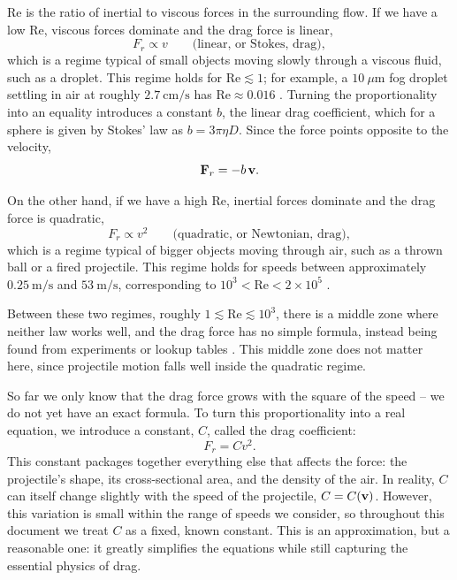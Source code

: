 \documentclass[11pt]{article}
\begin{document}
$\mathrm{Re}$ is the ratio of inertial to viscous forces in the
surrounding flow. If we have a low $\mathrm{Re}$, viscous forces
dominate and the drag force is linear,
\begin{equation}
    F_r \propto v \qquad \text{(linear, or Stokes, drag)},
\end{equation}
which is a regime typical of small objects moving slowly 
through a viscous fluid, such as a droplet. This regime holds for
$\mathrm{Re} \lesssim 1$; for example, a $10\ \mu\mathrm{m}$ fog
droplet settling in air at roughly $2.7\ \mathrm{cm/s}$ has
$\mathrm{Re} \approx 0.016$ \cite{lubarda2022}. Turning the
proportionality into an equality introduces a constant $b$, the linear
drag coefficient, which for a sphere is given by Stokes' law as
$b = 3\pi\eta D$. Since the force points opposite to the velocity,
\begin{equation}
\vb{F}_r = -b\,\vb{v}.
\end{equation}

On the other hand, if we have a high $\mathrm{Re}$, inertial forces
dominate and the drag force is quadratic,
\begin{equation}
    F_r \propto v^2 \qquad \text{(quadratic, or Newtonian, drag)},
\end{equation}
which is a regime typical of bigger objects moving through air,
such as a thrown ball or a fired projectile. This regime holds for
speeds between approximately $0.25\ \mathrm{m/s}$ and $53\ \mathrm{m/s}$,
corresponding to $10^3 < \mathrm{Re} < 2\times10^5$
\cite{chudinov2013}.

Between these two regimes, roughly $1 \lesssim \mathrm{Re} \lesssim 10^3$,
there is a middle zone where neither law works well, and the drag force
has no simple formula, instead being found from experiments or lookup
tables \cite{lubarda2022}. This middle zone does not matter here, since
projectile motion falls well inside the quadratic regime.

So far we only know that the drag force grows with the square of the
speed -- we do not yet have an exact formula. To turn this
proportionality into a real equation, we introduce a constant, $C$,
called the drag coefficient:
\begin{equation}
    F_r = C v^2.
\end{equation}
This constant packages together everything else that affects the
force: the projectile's shape, its cross-sectional area, and the
density of the air. In reality, $C$ can itself change slightly with
the speed of the projectile, $C = C(\vb{v})$. However, this variation
is small within the range of speeds we consider, so throughout this
document we treat $C$ as a fixed, known constant. This is an
approximation, but a reasonable one: it greatly simplifies the
equations while still capturing the essential physics of drag.
\end{document}
